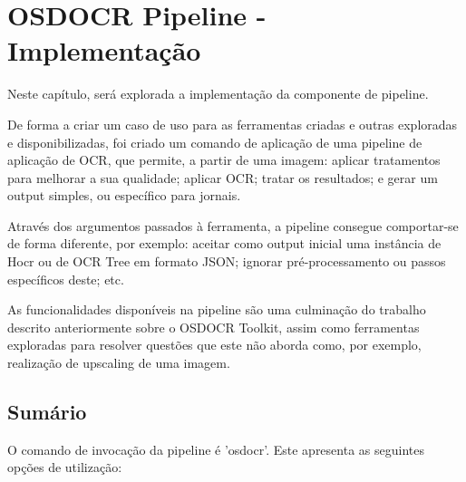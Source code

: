 \chapter{OSDOCR Pipeline - Implementação}
\label{cap_osdocr_pipeline_implementacao}

Neste capítulo, será explorada a implementação da componente de pipeline.

De forma a criar um caso de uso para as ferramentas criadas e outras exploradas e disponibilizadas, foi criado um comando de aplicação de uma pipeline de aplicação de OCR, que permite, a partir de uma imagem: aplicar tratamentos para melhorar a sua qualidade; aplicar OCR; tratar os resultados; e gerar um output simples, ou específico para jornais.

Através dos argumentos passados à ferramenta, a pipeline consegue comportar-se de forma diferente, por exemplo: aceitar como output inicial uma instância de Hocr ou de OCR Tree em formato JSON; ignorar pré-processamento ou passos específicos deste; etc.

As funcionalidades disponíveis na pipeline são uma culminação do trabalho descrito anteriormente sobre o OSDOCR Toolkit, assim como ferramentas exploradas para resolver questões que este não aborda como, por exemplo, realização de upscaling de uma imagem.

\section{Sumário}

O comando de invocação da pipeline é 'osdocr'. Este apresenta as seguintes opções de utilização:

